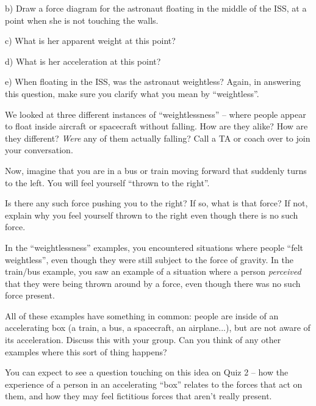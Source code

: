 \documentclass[12pt]{article}
\begin{document}
\begin{minipage}{0.3\textwidth}
b) Draw a force diagram for the astronaut floating in the middle of the ISS, at a point when she is not touching the walls. 

\end{minipage}
\hspace{0.05\textwidth}
\begin{minipage}{0.3\textwidth}

c) What is her apparent weight at this point?
\vspace{2em}

\end{minipage}
\begin{minipage}{0.3\textwidth}
	
d) What is her acceleration at this point?
	\vspace{2em}
	
\end{minipage}
\vspace{2in}

e) When floating in the ISS, was the astronaut weightless? Again, in answering this question, make sure you clarify what you mean by ``weightless''.


\vspace{2in}
We looked at three different instances of ``weightlessness'' -- where people appear to float inside aircraft or spacecraft without falling. How are they alike? How are they different? {\it Were} any of them actually falling? Call a TA or coach over to join your conversation. 


\vspace{3in}

Now, imagine that you are in a bus or train moving forward that suddenly turns to the left. You will feel yourself ``thrown to the right''.

Is there any such force pushing you to the right? If so, what is that force? If not, explain why you feel yourself thrown to the right even though there is no such force.

\vspace{1in}

\newpage

In the ``weightlessness'' examples, you encountered situations where people ``felt weightless'', even though they were still subject to the force of gravity. In the train/bus example, you saw an example of a situation where a person {\it perceived} that they were being thrown around by a force, even though there was no such force present.

All of these examples have something in common: people are inside of an accelerating box (a train, a bus, a spacecraft, an airplane...), but are not aware of its acceleration. Discuss this with your group. Can you think of any other examples where this sort of thing happens?


You can expect to see a question touching on this idea on Quiz 2 -- how the experience of a person in an accelerating ``box'' relates to the forces that act on them, and how they may feel fictitious forces that aren't really present.

\vspace{2in}
\end{document}
